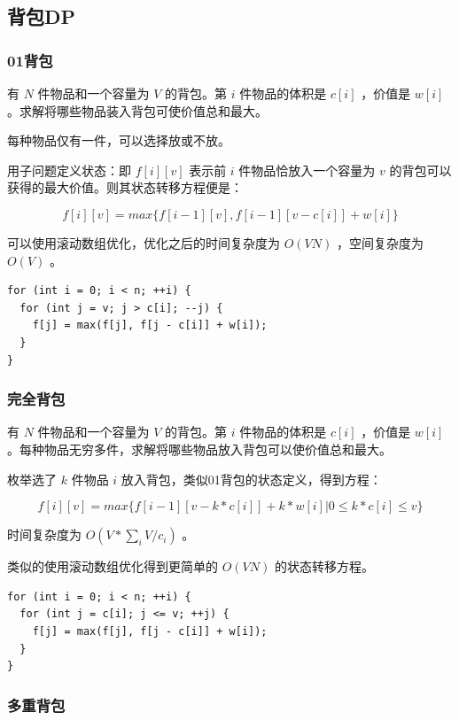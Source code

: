 \documentclass[11pt]{article}
\begin{document}
\subsection{背包DP}
\label{sec-2-2}
\subsubsection{01背包}
\label{sec-2-2-1}

有 $N$ 件物品和一个容量为 $V$ 的背包。第 $i$ 件物品的体积是 $c[i]$ ，价值是 $w[i]$ 。求解将哪些物品装入背包可使价值总和最大。

每种物品仅有一件，可以选择放或不放。

用子问题定义状态：即 $f[i][v]$ 表示前 $i$ 件物品恰放入一个容量为 $v$ 的背包可以获得的最大价值。则其状态转移方程便是：

$$
f[i][v]=max\{f[i-1][v],f[i-1][v-c[i]]+w[i]\}
$$

可以使用滚动数组优化，优化之后的时间复杂度为 $O(VN)$ ，空间复杂度为 $O(V)$ 。

\begin{verbatim}
for (int i = 0; i < n; ++i) {
  for (int j = v; j > c[i]; --j) {
    f[j] = max(f[j], f[j - c[i]] + w[i]);
  }
}
\end{verbatim}

\subsubsection{完全背包}
\label{sec-2-2-2}

有 $N$ 件物品和一个容量为 $V$ 的背包。第 $i$ 件物品的体积是 $c[i]$ ，价值是 $w[i]$ 。每种物品无穷多件，求解将哪些物品放入背包可以使价值总和最大。

枚举选了 $k$ 件物品 $i$ 放入背包，类似01背包的状态定义，得到方程：

$$
f[i][v]=max\{f[i-1][v-k*c[i]]+k*w[i]|0 \leq k*c[i] \leq v\}
$$

时间复杂度为 $O(V*\sum_i V/c_i)$ 。

类似的使用滚动数组优化得到更简单的 $O(VN)$ 的状态转移方程。

\begin{verbatim}
for (int i = 0; i < n; ++i) {
  for (int j = c[i]; j <= v; ++j) {
    f[j] = max(f[j], f[j - c[i]] + w[i]);
  }
}
\end{verbatim}

\subsubsection{多重背包}
\label{sec-2-2-3}
\end{document}
